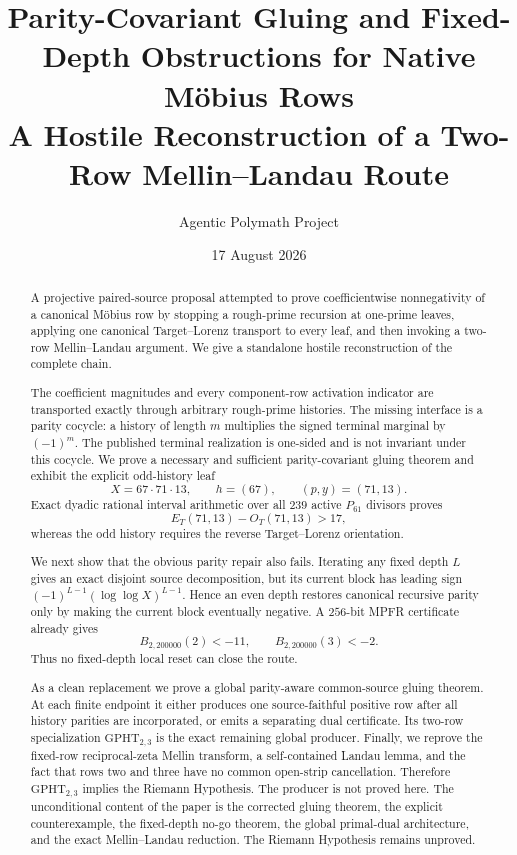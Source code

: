 \documentclass[11pt]{article}
\title{Parity-Covariant Gluing and Fixed-Depth Obstructions for Native M\"obius Rows\\
\large A Hostile Reconstruction of a Two-Row Mellin--Landau Route}
\author{Agentic Polymath Project}
\date{17 August 2026}
\newcommand{\1}{\mathbf 1}
\newcommand{\GPHT}{\mathrm{GPHT}_{2,3}}
\begin{document}
\maketitle

\begin{abstract}
A projective paired-source proposal attempted to prove coefficientwise
nonnegativity of a canonical M\"obius row by stopping a rough-prime recursion at
one-prime leaves, applying one canonical Target--Lorenz transport to every
leaf, and then invoking a two-row Mellin--Landau argument.  We give a standalone
hostile reconstruction of the complete chain.

The coefficient magnitudes and every component-row activation indicator are
transported exactly through arbitrary rough-prime histories.  The missing
interface is a parity cocycle: a history of length $m$ multiplies the signed
terminal marginal by $(-1)^m$.  The published terminal realization is
one-sided and is not invariant under this cocycle.  We prove a necessary and
sufficient parity-covariant gluing theorem and exhibit the explicit odd-history
leaf
\[
 X=67\cdot71\cdot13,\qquad h=(67),\qquad(p,y)=(71,13).
\]
Exact dyadic rational interval arithmetic over all $239$ active $P_{61}$
divisors proves
\[
 E_T(71,13)-O_T(71,13)>17,
\]
whereas the odd history requires the reverse Target--Lorenz orientation.

We next show that the obvious parity repair also fails.  Iterating any fixed
depth $L$ gives an exact disjoint source decomposition, but its current block
has leading sign $(-1)^{L-1}(\log\log X)^{L-1}$.  Hence an even depth restores
canonical recursive parity only by making the current block eventually
negative.  A $256$-bit MPFR certificate already gives
\[
 B_{2,200000}(2)<-11,\qquad B_{2,200000}(3)<-2.
\]
Thus no fixed-depth local reset can close the route.

As a clean replacement we prove a global parity-aware common-source gluing
theorem.  At each finite endpoint it either produces one source-faithful
positive row after all history parities are incorporated, or emits a separating
dual certificate.  Its two-row specialization $\GPHT$ is the exact remaining
global producer.  Finally, we reprove the fixed-row reciprocal-zeta Mellin
transform, a self-contained Landau lemma, and the fact that rows two and three
have no common open-strip cancellation.  Therefore $\GPHT$ implies the Riemann
Hypothesis.  The producer is not proved here.  The unconditional content of the
paper is the corrected gluing theorem, the explicit counterexample, the
fixed-depth no-go theorem, the global primal-dual architecture, and the exact
Mellin--Landau reduction.  The Riemann Hypothesis remains unproved.
\end{abstract}
\end{document}

